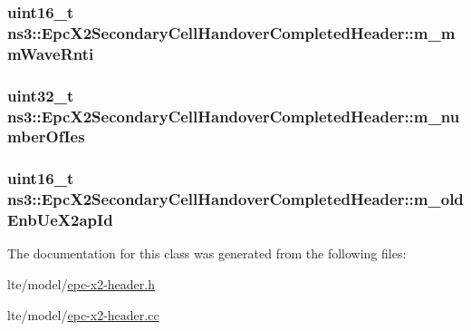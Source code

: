 \subsubsection[{\texorpdfstring{m\+\_\+mm\+Wave\+Rnti}{m_mmWaveRnti}}]{\setlength{\rightskip}{0pt plus 5cm}uint16\+\_\+t ns3\+::\+Epc\+X2\+Secondary\+Cell\+Handover\+Completed\+Header\+::m\+\_\+mm\+Wave\+Rnti\hspace{0.3cm}{\ttfamily [private]}}\hypertarget{classns3_1_1EpcX2SecondaryCellHandoverCompletedHeader_a5ca4f74de5b15e9642bd8924c7598dcc}{}\label{classns3_1_1EpcX2SecondaryCellHandoverCompletedHeader_a5ca4f74de5b15e9642bd8924c7598dcc}
\subsubsection[{\texorpdfstring{m\+\_\+number\+Of\+Ies}{m_numberOfIes}}]{\setlength{\rightskip}{0pt plus 5cm}uint32\+\_\+t ns3\+::\+Epc\+X2\+Secondary\+Cell\+Handover\+Completed\+Header\+::m\+\_\+number\+Of\+Ies\hspace{0.3cm}{\ttfamily [private]}}\hypertarget{classns3_1_1EpcX2SecondaryCellHandoverCompletedHeader_a576bd1c4d8cfc5970ebb7b63a7151acb}{}\label{classns3_1_1EpcX2SecondaryCellHandoverCompletedHeader_a576bd1c4d8cfc5970ebb7b63a7151acb}
\subsubsection[{\texorpdfstring{m\+\_\+old\+Enb\+Ue\+X2ap\+Id}{m_oldEnbUeX2apId}}]{\setlength{\rightskip}{0pt plus 5cm}uint16\+\_\+t ns3\+::\+Epc\+X2\+Secondary\+Cell\+Handover\+Completed\+Header\+::m\+\_\+old\+Enb\+Ue\+X2ap\+Id\hspace{0.3cm}{\ttfamily [private]}}\hypertarget{classns3_1_1EpcX2SecondaryCellHandoverCompletedHeader_a85935fad7c77a923df925fee55f9cf68}{}\label{classns3_1_1EpcX2SecondaryCellHandoverCompletedHeader_a85935fad7c77a923df925fee55f9cf68}


The documentation for this class was generated from the following files\+:\begin{DoxyCompactItemize}
\item 
lte/model/\hyperlink{epc-x2-header_8h}{epc-\/x2-\/header.\+h}\item 
lte/model/\hyperlink{epc-x2-header_8cc}{epc-\/x2-\/header.\+cc}\end{DoxyCompactItemize}
